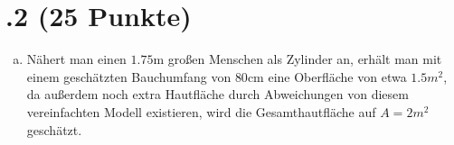 \section*{\nr.2 \tittwo (25 Punkte)}
\begin{enumerate}[(a)]
\item Nähert man einen $1.75\mathrm{m}$ großen Menschen als Zylinder an, erhält man mit einem geschätzten Bauchumfang von $80\mathrm{cm}$ eine Oberfläche von etwa $1.5m^2$, da außerdem noch extra Hautfläche durch Abweichungen von diesem vereinfachten Modell existieren, wird die Gesamthautfläche auf $A=2m^2$ geschätzt.
\end{enumerate}